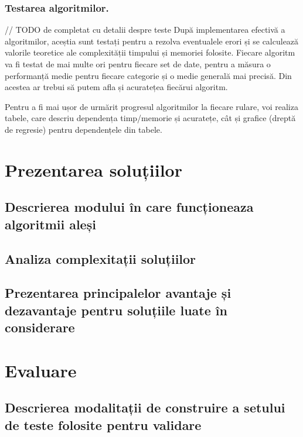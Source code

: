 \documentclass[runningheads]{llncs}
\begin{document}
\subsubsection{Testarea algoritmilor.} // TODO de completat cu detalii despre teste
După implementarea efectivă a algoritmilor, aceștia sunt testați pentru a rezolva
eventualele erori și se calculează valorile teoretice ale complexității timpului și memoriei folosite. \newline
Fiecare algoritm va fi testat de mai multe ori pentru fiecare set de date, pentru a măsura o performanță medie pentru fiecare
categorie și o medie generală mai precisă. \newline
Din acestea ar trebui să putem afla și acuratețea fiecărui algoritm. \newline

Pentru a fi mai ușor de urmărit progresul algoritmilor la fiecare rulare, voi realiza tabele, care descriu dependența
timp/memorie și acuratețe, cât și grafice (dreptă de regresie) pentru dependențele din tabele.

\section{Prezentarea soluțiilor}

\subsection{Descrierea modului în care funcționeaza algoritmii aleși}



\subsection{Analiza complexitații soluțiilor}



\subsection{Prezentarea principalelor avantaje și dezavantaje pentru soluțiile luate în considerare}



\section{Evaluare}

\subsection{Descrierea modalitații de construire a setului de teste folosite pentru validare}
\end{document}

